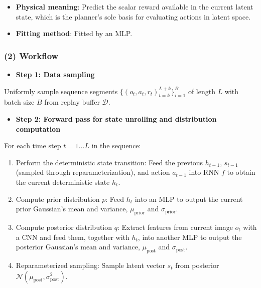 \begin{itemize}
\tightlist
\item
  \textbf{Physical meaning}: Predict the scalar reward available in the current latent state, which is the planner's sole basis for evaluating actions in latent space.
\item
  \textbf{Fitting method}: Fitted by an MLP.
\end{itemize}

\hypertarget{workflow-4}{%
\subsubsection{(2) Workflow}\label{workflow-4}}

\begin{itemize}
\tightlist
\item
  \textbf{Step 1: Data sampling}
\end{itemize}

Uniformly sample sequence segments \(\lbrace(o_t, a_t, r_t)_{t=k}^{L+k}\rbrace_{i=1}^{B}\) of length \(L\) with batch size \(B\) from replay buffer \(\mathcal{D}\).

\begin{itemize}
\tightlist
\item
  \textbf{Step 2: Forward pass for state unrolling and distribution computation}
\end{itemize}

For each time step \(t = 1 \ldots L\) in the sequence:

\begin{enumerate}
\def\labelenumi{\arabic{enumi}.}
\tightlist
\item
  Perform the deterministic state transition: Feed the previous \(h_{t-1}\), \(s_{t-1}\) (sampled through reparameterization), and action \(a_{t-1}\) into RNN \(f\) to obtain the current deterministic state \(h_t\).
\item
  Compute prior distribution \(p\): Feed \(h_t\) into an MLP to output the current prior Gaussian's mean and variance, \(\mu_{\mathrm{prior}}\) and \(\sigma_{\mathrm{prior}}\).
\item
  Compute posterior distribution \(q\): Extract features from current image \(o_t\) with a CNN and feed them, together with \(h_t\), into another MLP to output the posterior Gaussian's mean and variance, \(\mu_{\mathrm{post}}\) and \(\sigma_{\mathrm{post}}\).
\item
  Reparameterized sampling: Sample latent vector \(s_t\) from posterior \(\mathcal{N}(\mu_{\mathrm{post}}, \sigma_{\mathrm{post}}^2)\).
\end{enumerate}

